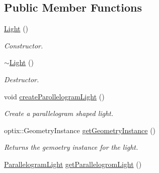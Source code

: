 \subsection*{Public Member Functions}
\begin{DoxyCompactItemize}
\item 
\hypertarget{class_light_aeb5df09a25a32f19fdffa761268ba24f}{\hyperlink{class_light_aeb5df09a25a32f19fdffa761268ba24f}{Light} ()}\label{class_light_aeb5df09a25a32f19fdffa761268ba24f}

\begin{DoxyCompactList}\small\item\em Constructor. \end{DoxyCompactList}\item 
\hypertarget{class_light_ad0e59fad13bb6cfadc25b2c477e9ddc7}{\hyperlink{class_light_ad0e59fad13bb6cfadc25b2c477e9ddc7}{$\sim$\-Light} ()}\label{class_light_ad0e59fad13bb6cfadc25b2c477e9ddc7}

\begin{DoxyCompactList}\small\item\em Destructor. \end{DoxyCompactList}\item 
\hypertarget{class_light_a7621ee283ddbe3fec59dee5c34e6317a}{void \hyperlink{class_light_a7621ee283ddbe3fec59dee5c34e6317a}{create\-Parollelogram\-Light} ()}\label{class_light_a7621ee283ddbe3fec59dee5c34e6317a}

\begin{DoxyCompactList}\small\item\em Create a parallelogram shaped light. \end{DoxyCompactList}\item 
\hypertarget{class_light_accfd9bb583a936a092bcca37866f0f40}{optix\-::\-Geometry\-Instance \hyperlink{class_light_accfd9bb583a936a092bcca37866f0f40}{get\-Geometry\-Instance} ()}\label{class_light_accfd9bb583a936a092bcca37866f0f40}

\begin{DoxyCompactList}\small\item\em Returns the gemoetry instance for the light. \end{DoxyCompactList}\item 
\hypertarget{class_light_a4a50c1f55863d0e7bcb6e15c56161f89}{\hyperlink{struct_light_1_1_parallelogram_light}{Parallelogram\-Light} \hyperlink{class_light_a4a50c1f55863d0e7bcb6e15c56161f89}{get\-Parallelogrom\-Light} ()}\label{class_light_a4a50c1f55863d0e7bcb6e15c56161f89}


\end{DoxyCompactItemize}
